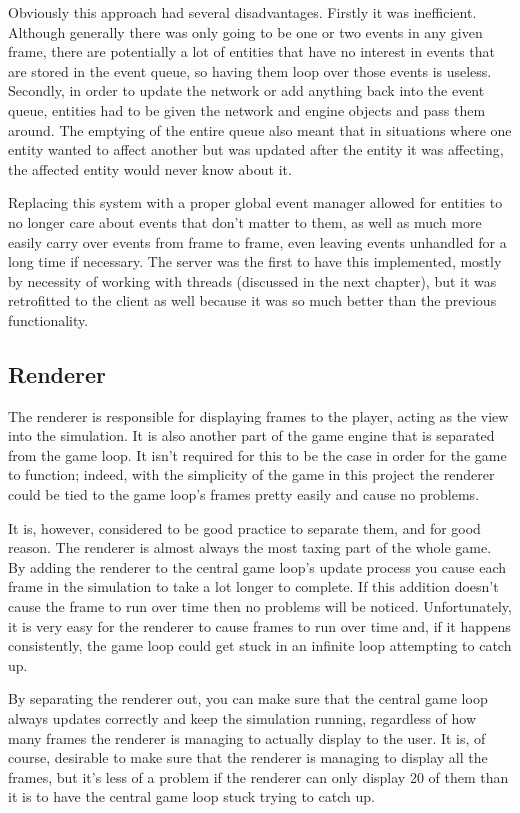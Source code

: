 Obviously this approach had several disadvantages. Firstly it was inefficient. Although generally there was only going to be one or two events in any given frame, there are potentially a lot of entities that have no interest in events that are stored in the event queue, so having them loop over those events is useless. Secondly, in order to update the network or add anything back into the event queue, entities had to be given the network and engine objects and pass them around. The emptying of the entire queue also meant that in situations where one entity wanted to affect another but was updated after the entity it was affecting, the affected entity would never know about it.

Replacing this system with a proper global event manager allowed for entities to no longer care about events that don't matter to them, as well as much more easily carry over events from frame to frame, even leaving events unhandled for a long time if necessary. The server was the first to have this implemented, mostly by necessity of working with threads (discussed in the next chapter), but it was retrofitted to the client as well because it was so much better than the previous functionality.

\subsection{Renderer}
The renderer is responsible for displaying frames to the player, acting as the view into the simulation. It is also another part of the game engine that is separated from the game loop. It isn't required for this to be the case in order for the game to function; indeed, with the simplicity of the game in this project the renderer could be tied to the game loop's frames pretty easily and cause no problems.

It is, however, considered to be good practice to separate them, and for good reason. The renderer is almost always the most taxing part of the whole game. By adding the renderer to the central game loop's update process you cause each frame in the simulation to take a lot longer to complete. If this addition doesn't cause the frame to run over time then no problems will be noticed. Unfortunately, it is very easy for the renderer to cause frames to run over time and, if it happens consistently, the game loop could get stuck in an infinite loop attempting to catch up.

By separating the renderer out, you can make sure that the central game loop always updates correctly and keep the simulation running, regardless of how many frames the renderer is managing to actually display to the user. It is, of course, desirable to make sure that the renderer is managing to display all the frames, but it's less of a problem if the renderer can only display 20 of them than it is to have the central game loop stuck trying to catch up.

